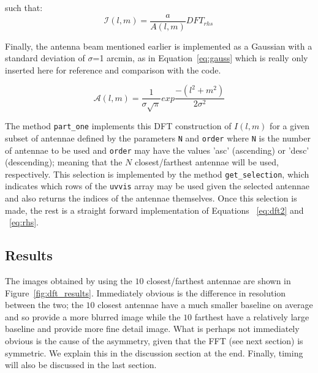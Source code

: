 \documentclass[11pt,letterpaper]{article}
\begin{document}
such that:
\begin{equation}\label{eq:dft2}
\mathcal{I}(l,m)= \frac{a}{A(l,m)} DFT_{rhs} \,
\end{equation}

Finally, the antenna beam mentioned earlier is implemented as a Gaussian with a standard deviation of $\sigma$=1 arcmin, as in Equation~\ref{eq:gauss} which is really only inserted here for reference and comparison with the code.

\begin{equation}\label{eq:gauss}
\mathcal{A}(l,m)= \frac{1}{\sigma \sqrt{\pi}} exp{ \frac{-(l^{2} + m^{2})}{2 \sigma^{2}} }
\end{equation}

The method \texttt{part\_one} implements this DFT construction of $I(l,m)$ for a given subset of antennae defined by the parameters \texttt{N} and \texttt{order} where \texttt{N} is the number of antennae to be used and \texttt{order} may have the values 'asc' (ascending) or 'desc' (descending); meaning that the $N$ closest/farthest antennae will be used, respectively. This selection is implemented by the method \texttt{get\_selection}, which indicates which rows of the \texttt{uvvis} array may be used given the selected antennae and also returns the indices of the antennae themselves. Once this selection is made, the rest is a straight forward implementation of Equations ~\ref{eq:dft2} and ~\ref{eq:rhs}.

\subsection{Results}

The images obtained by using the $10$ closest/farthest antennae are shown in Figure~\ref{fig:dft_results}. Immediately obvious is the difference in resolution between the two; the $10$ closest antennae have a much smaller baseline on average and so provide a more blurred image while the $10$ farthest have a relatively large baseline and provide more fine detail image. What is perhaps not immediately obvious is the cause of the asymmetry, given that the FFT (see next section) is symmetric. We explain this in the discussion section at the end. Finally, timing will also be discussed in the last section.
\end{document}
